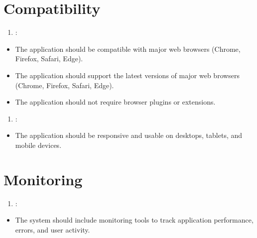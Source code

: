 \documentclass[letterpaper,10pt,english]{sphinxmanual}
\begin{document}
\section{Compatibility}
\label{\detokenize{modules/requirements:compatibility}}\begin{enumerate}
%
\setcounter{enumi}{9}
\item {} 
\sphinxAtStartPar
{}:

\end{enumerate}
\begin{itemize}
\item {} 
\sphinxAtStartPar
The application should be compatible with major web browsers (Chrome, Firefox, Safari, Edge).

\item {} 
\sphinxAtStartPar
The application should support the latest versions of major web browsers (Chrome, Firefox, Safari, Edge).

\item {} 
\sphinxAtStartPar
The application should not require browser plugins or extensions.

\end{itemize}
\begin{enumerate}
%
\setcounter{enumi}{10}
\item {} 
\sphinxAtStartPar
{}:

\end{enumerate}
\begin{itemize}
\item {} 
\sphinxAtStartPar
The application should be responsive and usable on desktops, tablets, and mobile devices.

\end{itemize}


\section{Monitoring}
\label{\detokenize{modules/requirements:monitoring}}\begin{enumerate}
%
\setcounter{enumi}{11}
\item {} 
\sphinxAtStartPar
{}:

\end{enumerate}
\begin{itemize}
\item {} 
\sphinxAtStartPar
The system should include monitoring tools to track application performance, errors, and user activity.

\end{itemize}
\end{document}
